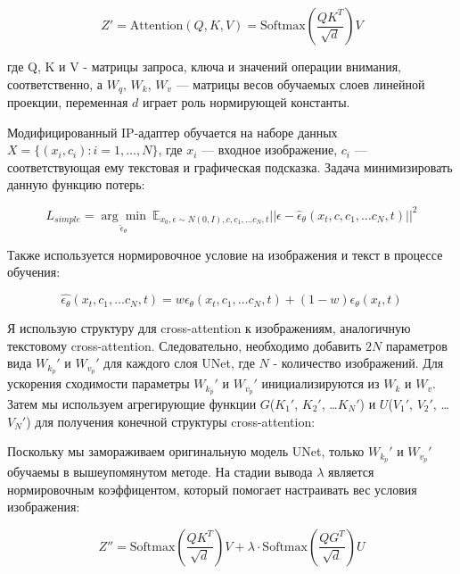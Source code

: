\documentclass{article}
\begin{document}
\begin{equation}
Z' = \text{Attention}(Q, K, V) = \text{Softmax}\left(\frac{QK^T}{\sqrt{d}}\right)V
\end{equation}

где Q, K и V - матрицы запроса, ключа и значений операции внимания, соответственно, а \(W_q\), \(W_k\), \(W_v\) --- матрицы весов обучаемых слоев линейной проекции, переменная \(d\) играет роль нормирующей константы.


Модифицированный IP-адаптер обучается на наборе данных \(X = \{(x_i, c_i) : i = 1, \ldots, N\}\), где \(x_i\) --- входное изображение, \(c_i\) --- соответствующая ему текстовая и графическая подсказка. Задача минимизировать данную функцию потерь:

\begin{equation}
   L_{simple} = \underset{\hat\epsilon_{\theta}}{\arg\min}\ \mathbb{E}_{x_0, \epsilon \sim N(0, I), c, c_{1}, \ldots c_{N}, t} ||\epsilon - \hat{\epsilon}_{\theta}(x_t, c, c_{1}, \ldots c_{N}, t) ||^2 
\end{equation}

Также используется нормировочное условие на изображения и текст в процессе обучения:

\begin{equation}
\hat{\epsilon_{\theta}}(x_{t}, c_{1}, \ldots c_{N}, t) = w \epsilon_{\theta}(x_{t}, c_{1}, \ldots c_{N}, t) + (1 - w) \epsilon_{\theta}(x_{t}, t)
\end{equation}

Я использую структуру для cross-attention к изображениям, аналогичную текстовому cross-attention. Следовательно, необходимо добавить \(2N\) параметров вида \(W_k_p'\) и \(W_v_p'\) для каждого слоя UNet, где \(N\) - количество изображений. Для ускорения сходимости параметры \(W_k_p'\) и \(W_v_p'\) инициализируются из \(W_k\) и \(W_v\). Затем мы используем агрегирующие функции \(G\)(\(K_{1}'\), \(K_{2}'\), \ldots \(K_{N}'\)) и \(U\)(\(V_{1}'\), \(V_{2}'\), \ldots \(V_{N}'\)) для получения конечной структуры cross-attention:

Поскольку мы замораживаем оригинальную модель UNet, только \(W_k_p'\) и \(W_v_p'\) обучаемы в вышеупомянутом методе.
На стадии вывода \(\lambda\) является нормировочным коэффицентом, который помогает настраивать вес условия изображения:

\begin{equation}
 Z'' = \text{Softmax}\left(\frac{QK^T}{\sqrt{d}}\right)V + \lambda \cdot \text{Softmax}\left(\frac{QG^T}{\sqrt{d}}\right)U
\end{equation}
\end{document}
